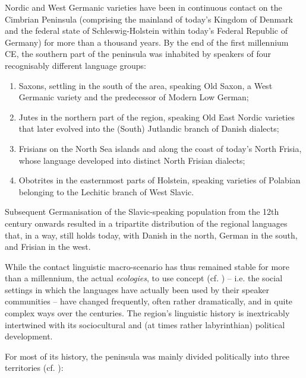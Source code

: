 \documentclass[output=paper]{langsci/langscibook}
\begin{document}
Nordic and West Germanic varieties have been in continuous contact on the Cimbrian Peninsula (comprising the mainland of today’s Kingdom of Denmark and the federal state of Schleswig-Holstein within today’s Federal Republic of Germany) for more than a thousand years. By the end of the first millennium CE, the southern part of the peninsula was inhabited by speakers of four recognisably different language groups:

 \begin{enumerate}
	\item Saxons, settling in the south of the area, speaking Old Saxon, a West Germanic variety and the predecessor of Modern Low German;
	\item Jutes in the northern part of the region, speaking Old East Nordic varieties that later evolved into the (South) Jutlandic branch of Danish dialects;
	\item Frisians on the North Sea islands and along the coast of today’s North Frisia, whose language developed into distinct North Frisian dialects;
	\item Obotrites in the easternmost parts of Holstein, speaking varieties of Polabian belonging to the Lechitic branch of West Slavic.
	\end{enumerate}

Subsequent Germanisation of the Slavic-speaking population from the 12th century onwards resulted in a tripartite distribution of the regional languages that, in a way, still holds today, with Danish in the north, German in the south, and Frisian in the west.

While the contact linguistic macro-scenario has thus remained stable for more than a millennium, the actual \textit{ecologies}, to use  concept (cf. \citealt{Eliasson.2013}) – i.e. the social settings in which the languages have actually been used by their speaker communities – have changed frequently, often rather dramatically, and in quite complex ways over the centuries. The region’s linguistic history is inextricably intertwined with its sociocultural and (at times rather labyrinthian) political development.

For most of its history, the peninsula was mainly divided politically into three territories (cf. ):
\end{document}

